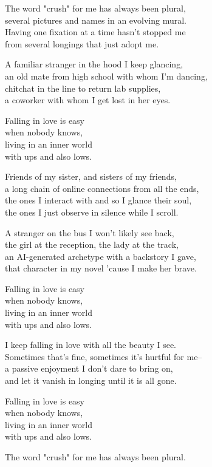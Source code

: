 \begin{lyrics}

The word "crush" for me has always been plural,\\
several pictures and names in an evolving mural.\\
Having one fixation at a time hasn't stopped me\\
from several longings that just adopt me.

A familiar stranger in the hood I keep glancing,\\
an old mate from high school with whom I'm dancing,\\
chitchat in the line to return lab supplies,\\
a coworker with whom I get lost in her eyes.

Falling in love is easy\\
when nobody knows,\\
living in an inner world\\
with ups and also lows.

Friends of my sister, and sisters of my friends,\\
a long chain of online connections from all the ends,\\
the ones I interact with and so I glance their soul,\\
the ones I just observe in silence while I scroll.

A stranger on the bus I won't likely see back,\\
the girl at the reception, the lady at the track,\\
an AI-generated archetype with a backstory I gave,\\
that character in my novel 'cause I make her brave.

Falling in love is easy\\
when nobody knows,\\
living in an inner world\\
with ups and also lows.


I keep falling in love with all the beauty I see.\\
Sometimes that's fine, sometimes it's hurtful for me--\\
a passive enjoyment I don't dare to bring on,\\
and let it vanish in longing until it is all gone.

Falling in love is easy\\
when nobody knows,\\
living in an inner world\\
with ups and also lows.

The word "crush" for me has always been plural.
\end{lyrics}

